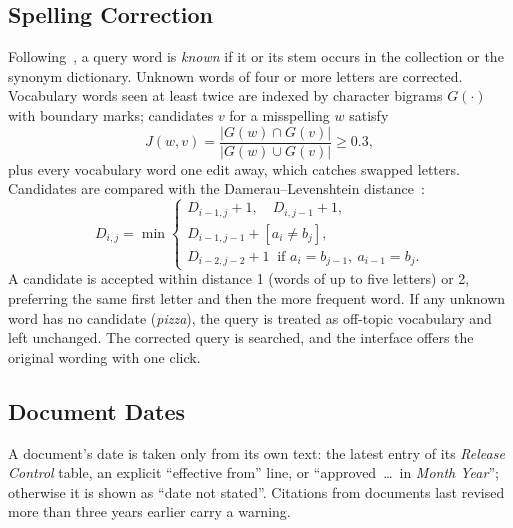 \documentclass[conference]{IEEEtran}
\begin{document}
\subsection{Spelling Correction}
Following~\cite{manning2008ir}, a query word is \emph{known} if it or its stem occurs in the collection or the synonym dictionary. Unknown words of four or more letters are corrected. Vocabulary words seen at least twice are indexed by character bigrams $G(\cdot)$ with boundary marks; candidates $v$ for a misspelling $w$ satisfy
\begin{equation}
J(w,v)=\frac{|G(w)\cap G(v)|}{|G(w)\cup G(v)|}\geq 0.3 , \label{eq:jaccard}
\end{equation}
plus every vocabulary word one edit away, which catches swapped letters. Candidates are compared with the Damerau--Levenshtein distance~\cite{damerau1964}:
\begin{equation}
D_{i,j}=\min\begin{cases}
D_{i-1,j}+1, \quad D_{i,j-1}+1,\\
D_{i-1,j-1}+[a_i\neq b_j],\\
D_{i-2,j-2}+1 \ \text{ if } a_i=b_{j-1},\ a_{i-1}=b_j .
\end{cases} \label{eq:dl}
\end{equation}
A candidate is accepted within distance 1 (words of up to five letters) or 2, preferring the same first letter and then the more frequent word. If any unknown word has no candidate (\emph{pizza}), the query is treated as off-topic vocabulary and left unchanged. The corrected query is searched, and the interface offers the original wording with one click.

\subsection{Document Dates}
A document's date is taken only from its own text: the latest entry of its \emph{Release Control} table, an explicit ``effective from'' line, or ``approved~\dots\ in \emph{Month Year}''; otherwise it is shown as ``date not stated''. Citations from documents last revised more than three years earlier carry a warning.
\end{document}
